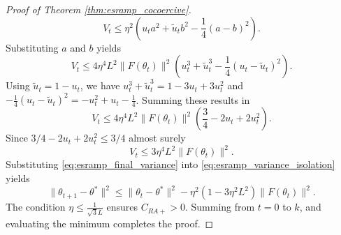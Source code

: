 \documentclass[letter,11pt]{article}
\begin{document}
\begin{proof}[Proof of Theorem \ref{thm:esramp_cocoercive}]
\begin{equation}
V_t \le \eta^2 \left( u_t a^2 + \tilde{u}_t b^2 - \frac{1}{4}(a-b)^2 \right).
\end{equation}
Substituting $a$ and $b$ yields
\begin{equation}
V_t \le 4\eta^4 L^2 \|F(\theta_t)\|^2 \left( u_t^3 + \tilde{u}_t^3 - \frac{1}{4}(u_t - \tilde{u}_t)^2 \right).
\end{equation}
Using $\tilde{u}_t = 1 - u_t$, we have $u_t^3 + \tilde{u}_t^3 = 1 - 3u_t + 3u_t^2$ and $-\frac{1}{4}(u_t - \tilde{u}_t)^2 = -u_t^2 + u_t - \frac{1}{4}$. Summing these results in
\begin{equation}
V_t \le 4\eta^4 L^2 \|F(\theta_t)\|^2 \left( \frac{3}{4} - 2u_t + 2u_t^2 \right).
\end{equation}
Since $3/4 - 2u_t + 2u_t^2 \leq 3/4$ almost surely
\begin{equation} \label{eq:esramp_final_variance}
V_t \le 3 \eta^4 L^2 \|F(\theta_t)\|^2.
\end{equation}
Substituting \eqref{eq:esramp_final_variance} into \eqref{eq:esramp_variance_isolation} yields
\begin{equation}
\|\theta_{t+1} - \theta^*\|^2\le \|\theta_t - \theta^*\|^2 - \eta^2 \left( 1 - 3 \eta^2 L^2 \right) \|F(\theta_t)\|^2.
\end{equation}
The condition $\eta \le \frac{1}{\sqrt{3}L}$ ensures $C_{RA+} > 0$. Summing from $t=0$ to $k$, and evaluating the minimum completes the proof.
\end{proof}
\end{document}
